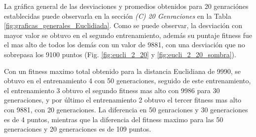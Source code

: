 \documentclass[conference]{IEEEtran}
\begin{document}
La gráfica general de las desviaciones y promedios obtenidos para 20 genraciónes establecidas puede observarla en la sección \textit{(C) 20 Genraciones} en la Tabla \ref{fig:graficas_generales_Euclidiada}.
Como se puede observar, la desviación con mayor valor se obtuvo en el segundo entrenamiento, además su puntaje fitness fue el mas alto de todos los demás con un valor de 9881, con una desviación que no sobrepasa los 9100 puntos (Fig. \ref{fig:eucli_2_20} y \ref{fig:eucli_2_20_sombra}).

Con un fitness maximo total obtenido para la distancia Euclidiana de 9990, se obtuvo en el entrenamiento 4 con 50 generaciones, seguido de este entrenamiento, el entrenamiento 3 obtuvo el segundo fitness mas alto con 9986 para 30 generaciones, y por último el entrenamiento 2 obtuvo el tercer fitness mas alto con 9881, con 20 generaciones. La diferencia en 50 genraciones y 30 generaciones es de 4 puntos, mientras que la diferencia del fitness maximo para las 50 generaciones y 20 generaciones es de 109 puntos. 
\end{document}
